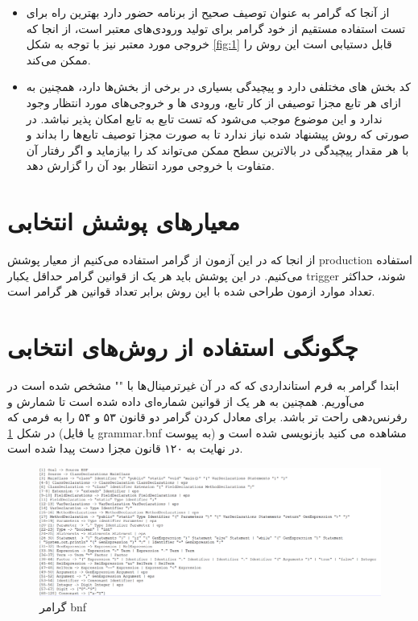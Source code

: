 \begin{itemize}
\item
از آنجا که گرامر به عنوان توصیف صحیح از برنامه حضور دارد بهترین راه برای تست استفاده مستقیم از خود گرامر برای تولید ورودی‌های معتبر است، از انجا که خروجی مورد معتبر نیز با توجه به شکل \ref{fig:1} قابل دستیابی است این روش را ممکن می‌کند. 

\item
کد بخش های مختلفی دارد و پیچیدگی بسیاری در برخی از بخش‌ها دارد، همچنین به ازای هر تابع مجزا توصیفی از کار تابع، ورودی ها و خروجی‌های مورد انتظار وجود ندارد و این موضوع موجب می‌شود که تست تابع به تابع امکان پذیر نباشد. در صورتی که روش پیشنهاد شده نیاز ندارد تا به صورت مجزا توصیف تابع‌ها را بداند و با هر مقدار پیچیدگی در بالاترین سطح ممکن می‌تواند کد را بیازماید و اگر رفتار آن متفاوت با خروجی مورد انتظار بود آن را گزارش دهد. 

\end{itemize}

\section{معیارهای پوشش انتخابی}\label{sec: method2}
از انجا که در این آزمون از گرامر استفاده می‌کنیم از معیار پوشش production استفاده می‌کنیم. در این پوشش باید هر یک از قوانین گرامر حداقل یکبار trigger شوند، حداکثر تعداد موارد ازمون طراحی شده با این روش برابر تعداد قوانین هر گرامر است. 


\section{چگونگی استفاده از روش‌های انتخابی}\label{sec: method3}

ابتدا گرامر به فرم استانداردی که که در آن غیرترمینال‌ها با "" مشخص شده است در می‌آوریم. همچنین به هر یک از قوانین شمار‌ه‌ای داده شده است تا شمارش و رفرنس‌دهی راحت تر باشد. برای معادل کردن گرامر دو قانون ۵۳ و ۵۴ را به فرمی که در شکل \ref{fig:2} (یا فایل grammar.bnf به پیوست) مشاهده می کنید بازنویسی شده است و در نهایت به ۱۲۰ قانون مجزا دست پیدا شده است. 

\begin{figure}[ht]
\centering
\includegraphics[scale=0.32]{grammar.png}
\caption{گرامر bnf}
\label{fig:2}
\end{figure}


